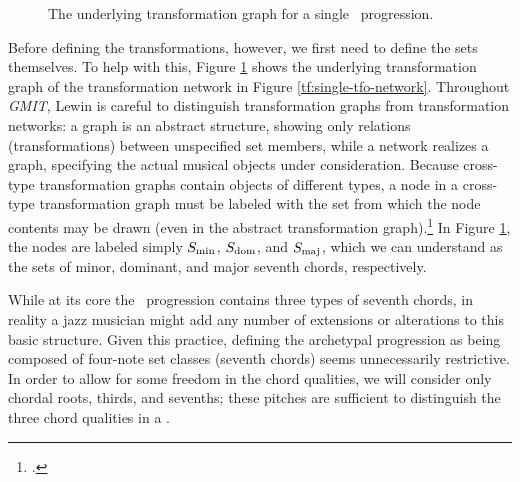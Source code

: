 \begin{figure}[btp]
  \caption{The underlying transformation graph for a single \tfo\ progression.}
  \label{tf:single-tfo-graph}
\end{figure}

Before defining the transformations, however, we first need to define the sets
themselves. To help with this, Figure \ref{tf:single-tfo-graph} shows the
underlying transformation graph of the transformation network in Figure
\ref{tf:single-tfo-network}. Throughout \emph{GMIT}, Lewin is careful to
distinguish transformation graphs from transformation networks: a graph is an
abstract structure, showing only relations (transformations) between
unspecified set members, while a network realizes a graph, specifying the
actual musical objects under consideration. Because cross-type
transformation graphs contain objects of different types, a node in a
cross-type transformation graph must be labeled with the set from which the
node contents may be drawn (even in the abstract transformation
graph).\footcite[7]{hook:2007} In Figure \ref{tf:single-tfo-graph}, the nodes
are labeled simply $S_{\mathrm{min}}$, $S_{\mathrm{dom}}$, and $S_{\mathrm{maj}}$, which we can understand as the
sets of minor, dominant, and major seventh chords, respectively.

While at its core the \tfo\ progression contains three types of seventh
chords, in reality a jazz musician might add any number of extensions or
alterations to this basic structure. Given this practice, defining the
archetypal progression as being composed of four-note set classes (seventh
chords) seems unnecessarily restrictive. In order to allow for some freedom in
the chord qualities, we will consider only chordal roots, thirds, and
sevenths; these pitches are sufficient to distinguish the three chord
qualities in a \tfo.

